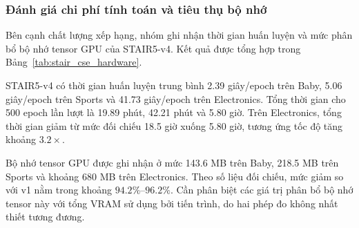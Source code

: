 
\subsubsection{Đánh giá chi phí tính toán và tiêu thụ bộ nhớ}

Bên cạnh chất lượng xếp hạng, nhóm ghi nhận thời gian huấn luyện và mức phân bổ bộ nhớ tensor GPU của STAIR5-v4. Kết quả được tổng hợp trong Bảng~\ref{tab:stair_cse_hardware}.

\begin{table}[!htbp]
    \centering
    \caption{Chi phí tính toán và bộ nhớ tensor GPU của STAIR5-v4.}
    \label{tab:stair_cse_hardware}
    \footnotesize
    \renewcommand{\arraystretch}{1.15}
    \setlength{\tabcolsep}{4pt}

\end{table}

STAIR5-v4 có thời gian huấn luyện trung bình 2.39 giây/epoch trên Baby, 5.06 giây/epoch trên Sports và 41.73 giây/epoch trên Electronics. Tổng thời gian cho 500 epoch lần lượt là 19.89 phút, 42.21 phút và 5.80 giờ. Trên Electronics, tổng thời gian giảm từ mức đối chiếu 18.5 giờ xuống 5.80 giờ, tương ứng tốc độ tăng khoảng $3.2\times$.

Bộ nhớ tensor GPU được ghi nhận ở mức 143.6 MB trên Baby, 218.5 MB trên Sports và khoảng 680 MB trên Electronics. Theo số liệu đối chiếu, mức giảm so với v1 nằm trong khoảng $94.2\%$--$96.2\%$. Cần phân biệt các giá trị phân bổ bộ nhớ tensor này với tổng VRAM sử dụng bởi tiến trình, do hai phép đo không nhất thiết tương đương.

